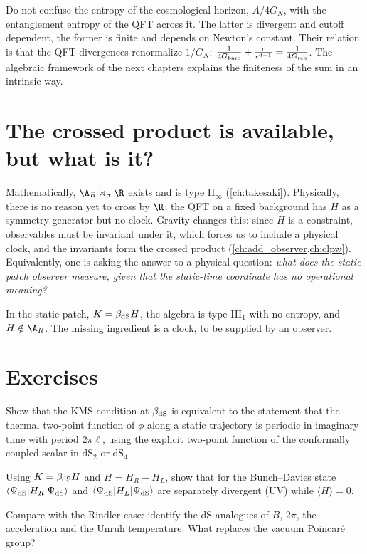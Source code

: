 \begin{whatwrong}
Do not confuse the entropy of the cosmological horizon, $A/4G_N$, with the entanglement entropy of the QFT across it. The latter is divergent and cutoff dependent, the former is finite and depends on Newton's constant. Their relation is that the QFT divergences renormalize $1/G_N$: $\frac{1}{4G_{\rm bare}}+\frac{c}{\epsilon^{d-1}}=\frac{1}{4G_{\rm ren}}$. The algebraic framework of the next chapters explains the finiteness of the sum in an intrinsic way.
\end{whatwrong}

\section{The crossed product is available, but what is it?}

Mathematically, $\A_R\rtimes_\sigma\R$ exists and is type II$_\infty$ (\cref{ch:takesaki}). Physically, there is no reason yet to cross by $\R$: the QFT on a fixed background has $H$ as a symmetry generator but no clock. Gravity changes this: since $H$ is a constraint, observables must be invariant under it, which forces us to include a physical clock, and the invariants form the crossed product (\cref{ch:add_observer,ch:clpw}). Equivalently, one is asking the answer to a physical question: \emph{what does the static patch observer measure, given that the static-time coordinate has no operational meaning?}

\begin{keyidea}
In the static patch, $K=\beta_{\rm dS}H$, the algebra is type III$_1$ with no entropy, and $H\notin\A_R$. The missing ingredient is a clock, to be supplied by an observer.
\end{keyidea}

\section*{Exercises}
\begin{exercise}
Show that the KMS condition at $\beta_{\rm dS}$ is equivalent to the statement that the thermal two-point function of $\phi$ along a static trajectory is periodic in imaginary time with period $2\pi\ell$, using the explicit two-point function of the conformally coupled scalar in $\mathrm{dS}_2$ or $\mathrm{dS}_4$.
\end{exercise}
\begin{exercise}
Using $K=\beta_{\rm dS}H$ and $H=H_R-H_L$, show that for the Bunch--Davies state $\langle\Psi_{\rm dS}|H_R|\Psi_{\rm dS}\rangle$ and $\langle\Psi_{\rm dS}|H_L|\Psi_{\rm dS}\rangle$ are separately divergent (UV) while $\langle H\rangle=0$.
\end{exercise}
\begin{exercise}
Compare with the Rindler case: identify the dS analogues of $B$, $2\pi$, the acceleration and the Unruh temperature. What replaces the vacuum Poincar\'e group?
\end{exercise}

